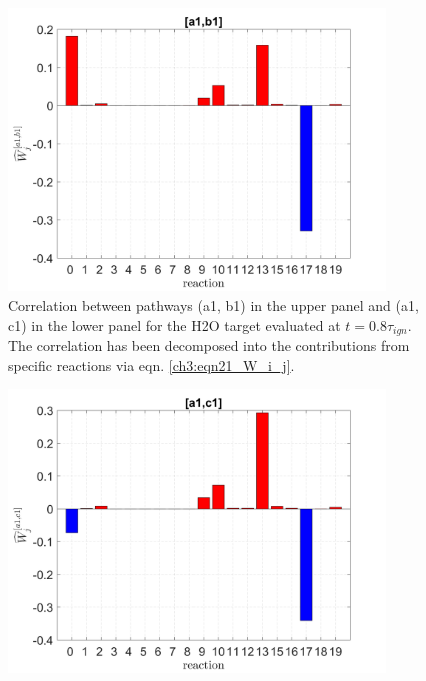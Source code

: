\begin{figure}[htbp]
	\caption[Correlation between pathways]{Correlation between pathways (a1, b1) in the upper panel and (a1, c1) in the lower panel for the H2O target evaluated at $t=0.8\tau_{ign}$. The correlation has been decomposed into the contributions
from specific reactions via eqn. \ref{ch3:eqn21_W_i_j}.}
    \begin{center}
	\includegraphics[width=100mm]{figs/chapter3/fig14_1.png}
    \end{center}
\label{ch3:fig14}
\end{figure}
\begin{figure}[htbp]
    \begin{center}
	\includegraphics[width=100mm]{figs/chapter3/fig14_2.png}
    \end{center}
\end{figure}
